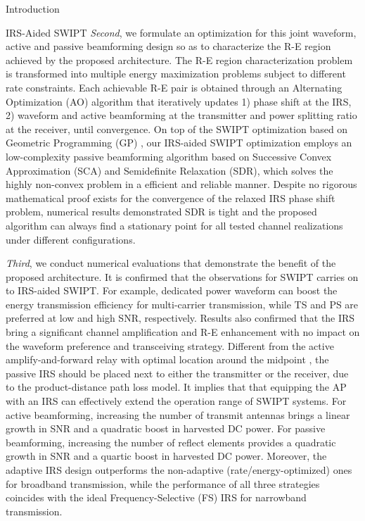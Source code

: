 \documentclass[journal]{IEEEtran}
\begin{document}
\begin{section}{Introduction}
\begin{subsection}{IRS-Aided SWIPT}
			\textit{Second}, we formulate an optimization for this joint waveform, active and passive beamforming design so as to characterize the R-E region achieved by the proposed architecture. The R-E region characterization problem is transformed into multiple energy maximization problems subject to different rate constraints. Each achievable R-E pair is obtained through an Alternating Optimization (AO) algorithm that iteratively updates 1) phase shift at the IRS, 2) waveform and active beamforming at the transmitter and power splitting ratio at the receiver, until convergence. On top of the SWIPT optimization based on Geometric Programming (GP) \cite{Clerckx2018b}, our IRS-aided SWIPT optimization employs an low-complexity passive beamforming algorithm based on Successive Convex Approximation (SCA) and Semidefinite Relaxation (SDR), which solves the highly non-convex problem in a efficient and reliable manner. Despite no rigorous mathematical proof exists for the convergence of the relaxed IRS phase shift problem, numerical results demonstrated SDR is tight and the proposed algorithm can always find a stationary point for all tested channel realizations under different configurations.

			\textit{Third}, we conduct numerical evaluations that demonstrate the benefit of the proposed architecture. It is confirmed that the observations for SWIPT carries on to IRS-aided SWIPT. For example, dedicated power waveform can boost the energy transmission efficiency for multi-carrier transmission, while TS and PS are preferred at low and high SNR, respectively. Results also confirmed that the IRS bring a significant channel amplification and R-E enhancement with no impact on the waveform preference and transceiving strategy. Different from the active amplify-and-forward relay with optimal location around the midpoint \cite{Li2017}, the passive IRS should be placed next to either the transmitter or the receiver, due to the product-distance path loss model. It implies that that equipping the AP with an IRS can effectively extend the operation range of SWIPT systems. For active beamforming, increasing the number of transmit antennas brings a linear growth in SNR and a quadratic boost in harvested DC power. For passive beamforming, increasing the number of reflect elements provides a quadratic growth in SNR and a quartic boost in harvested DC power. Moreover, the adaptive IRS design outperforms the non-adaptive (rate/energy-optimized) ones for broadband transmission, while the performance of all three strategies coincides with the ideal Frequency-Selective (FS) IRS for narrowband transmission.


\end{subsection}
\end{section}
\end{document}
